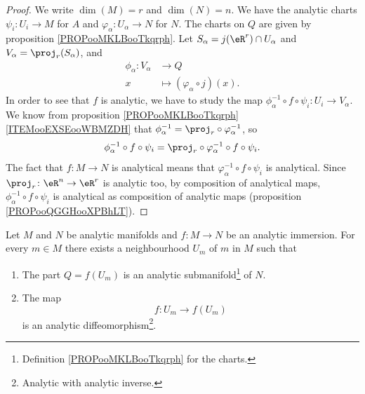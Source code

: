 \begin{proof}
	We write \( \dim(M)=r\) and \( \dim(N)=n\). We have the analytic charts \(\psi_i \colon U_i\to M  \) for \( A\) and \(\varphi_{\alpha} \colon U_{\alpha}\to N  \) for \( N\). The charts on \( Q\) are given by proposition \ref{PROPooMKLBooTkqrph}. Let \( S_{\alpha}=j(\eR^r)\cap U_{\alpha}\) and \( V_{\alpha}=\proj_r(S_{\alpha})\), and
	\begin{equation}
		\begin{aligned}
			\phi_{\alpha}\colon V_{\alpha} & \to Q                                 \\
			x                              & \mapsto (\varphi_{\alpha}\circ j)(x).
		\end{aligned}
	\end{equation}
	In order to see that \( f\) is analytic, we have to study the map \( \phi_{\alpha}^{-1}\circ f\circ \psi_i\colon U_i\to V_{\alpha}\). We know from proposition \ref{PROPooMKLBooTkqrph}\ref{ITEMooEXSEooWBMZDH} that \( \phi_{\alpha}^{-1}=\proj_r\circ\varphi_{\alpha}^{-1}\), so
	\begin{equation}
		\phi_{\alpha}^{-1}\circ f\circ\psi_i=\proj_{r}\circ\varphi_{\alpha}^{-1}\circ f\circ\psi_i.
	\end{equation}
	The fact that \(f \colon M\to N  \) is analytical means that \( \varphi_{\alpha}^{-1}\circ f\circ \psi_i\) is analytical. Since \(\proj_r \colon \eR^n\to \eR^r  \) is analytic too, by composition of analytical maps, \( \phi_{\alpha}^{-1}\circ f\circ\psi_i\) is analytical as composition of analytic maps (proposition \ref{PROPooQGGHooXPBhLT}).
\end{proof}

\begin{theorem}	\label{THOooXHXHooKMsuld}
	Let \( M\) and \( N\) be analytic manifolds and \(f \colon M\to N  \) be an analytic immersion. For every \( m\in M\) there exists a neighbourhood \( U_m\) of \( m\) in \( M\) such that
	\begin{enumerate}
		\item
		      The part \( Q=f(U_m)\) is an analytic submanifold\footnote{Definition \ref{PROPooMKLBooTkqrph} for the charts.} of \( N\).
		\item
		      The map
		      \begin{equation}
			      f \colon U_m\to  	f(U_m)
		      \end{equation}
		      is an analytic diffeomorphism\footnote{Analytic with analytic inverse.}.
	\end{enumerate}
\end{theorem}

